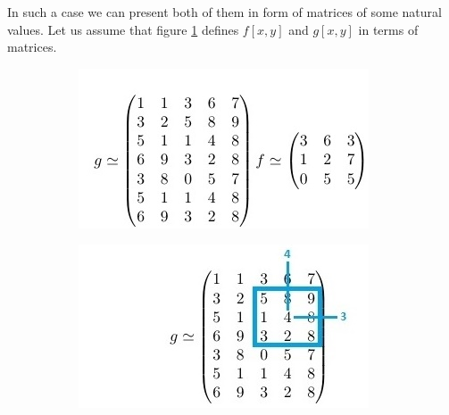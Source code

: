 \documentclass{article}
\begin{document}
\begin{description}
In such a case we can present both of them in form of matrices of some natural values. Let us assume that figure \ref{fig:example_repr} defines $f[x,y]$ and $g[x,y]$ in terms of matrices.
\begin{figure}[H]
\centering
\begin{subfigure}{.4\textwidth}
  \centering
  \includegraphics[width=0.95\linewidth]{_Figures/example_11.jpg}
  \caption{}
  \label{fig:example_repr}
\end{subfigure}%
\begin{subfigure}{.4\textwidth}
  \centering
  \includegraphics[width=0.95\linewidth]{_Figures/example_12.jpg}
  \caption{}
  \label{fig:example_43}
\end{subfigure}%
\caption{}
\label{fig:results_tresh}
\end{figure}


\end{description}
\end{document}
